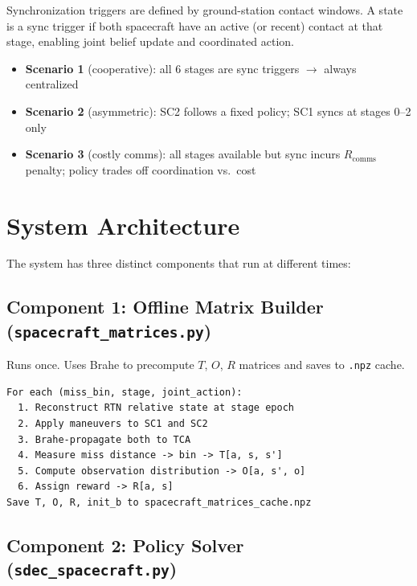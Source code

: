 \documentclass[11pt]{article}
\begin{document}
Synchronization triggers are defined by ground-station contact windows.
A state is a sync trigger if both spacecraft have an active (or recent) contact
at that stage, enabling joint belief update and coordinated action.

\begin{itemize}
  \item \textbf{Scenario 1} (cooperative): all 6 stages are sync triggers
        $\rightarrow$ always centralized
  \item \textbf{Scenario 2} (asymmetric): SC2 follows a fixed policy; SC1
        syncs at stages 0--2 only
  \item \textbf{Scenario 3} (costly comms): all stages available but sync
        incurs $R_\text{comms}$ penalty; policy trades off coordination vs.\ cost
\end{itemize}

\section{System Architecture}

The system has three distinct components that run at different times:

\subsection{Component 1: Offline Matrix Builder (\texttt{spacecraft\_matrices.py})}

Runs once. Uses Brahe to precompute $T$, $O$, $R$ matrices and saves to
\texttt{.npz} cache.

\begin{verbatim}
For each (miss_bin, stage, joint_action):
  1. Reconstruct RTN relative state at stage epoch
  2. Apply maneuvers to SC1 and SC2
  3. Brahe-propagate both to TCA
  4. Measure miss distance -> bin -> T[a, s, s']
  5. Compute observation distribution -> O[a, s', o]
  6. Assign reward -> R[a, s]
Save T, O, R, init_b to spacecraft_matrices_cache.npz
\end{verbatim}

\subsection{Component 2: Policy Solver (\texttt{sdec\_spacecraft.py})}
\end{document}

